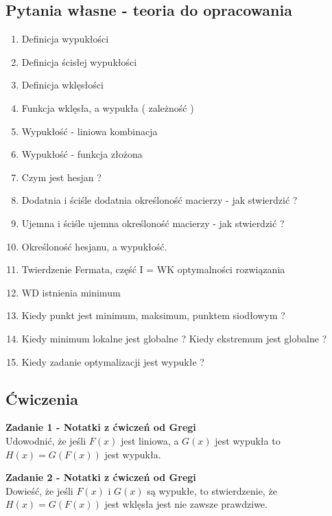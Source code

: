 \documentclass[a4paper,11pt]{article}
\begin{document}
\subsection{Pytania własne - teoria do opracowania}
\begin{enumerate}
\item Definicja wypukłości 
\item Definicja ścisłej wypukłości 
\item Definicja wklęsłości
\item Funkcja wklęsła, a wypukła ( zależność )
\item Wypukłość - liniowa kombinacja
\item Wypukłość - funkcja złożona 
\item Czym jest hesjan ?
\item Dodatnia i ściśle dodatnia określoność macierzy - jak stwierdzić ?
\item Ujemna i ściśle ujemna określoność macierzy - jak stwierdzić ?
\item Określoność hesjanu, a wypukłość.
\item Twierdzenie Fermata, część I = WK optymalności rozwiązania
\item WD istnienia minimum
\item Kiedy punkt jest minimum, maksimum, punktem siodłowym ?
\item Kiedy minimum lokalne jest globalne ? Kiedy ekstremum jest globalne ?
\item Kiedy zadanie optymalizacji jest wypukłe ?
\end{enumerate}

\subsection{Ćwiczenia}

\begin{framed}
\textbf{Zadanie 1 - Notatki z ćwiczeń od Gregi} \\
Udowodnić, że jeśli \( F(x) \) jest liniowa, a \( G(x) \) jest wypukła to \( H(x) = G(F(x)) \) jest wypukła.
\end{framed}

\begin{framed}
\textbf{Zadanie 2 - Notatki z ćwiczeń od Gregi} \\
Dowieść, że jeśli \( F(x) \) i \( G(x) \) są wypukłe, to stwierdzenie, że \( H(x)=G(F(x)) \) jest wklęsła jest nie zawsze prawdziwe. 
\end{framed}
\end{document}

